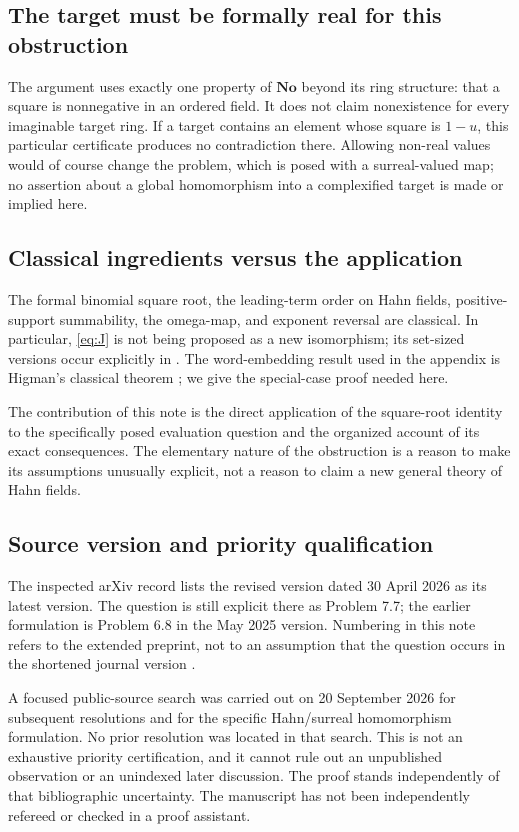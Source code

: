 \documentclass[11pt,letterpaper]{article}
\theoremstyle{definition}
\theoremstyle{remark}
\newcommand{\No}{\mathbf{No}}
\begin{document}
\subsection{The target must be formally real for this obstruction}
The argument uses exactly one property of $\No$ beyond its ring structure:
that a square is nonnegative in an ordered field. It does not claim
nonexistence for every imaginable target ring. If a target contains an element
whose square is $1-u$, this particular certificate produces no contradiction
there. Allowing non-real values would of course change the problem, which is
posed with a surreal-valued map; no assertion about a global homomorphism into
a complexified target is made or implied here.

\subsection{Classical ingredients versus the application}
The formal binomial square root, the leading-term order on Hahn fields,
positive-support summability, the omega-map, and exponent reversal are
classical. In particular, \eqref{eq:J} is not being proposed as a new
isomorphism; its set-sized versions occur explicitly in
\citet[p.~176]{DriesEhrlich2001}. The word-embedding result used in the appendix
is Higman's classical theorem \citep{Higman1952}; we give the special-case proof
needed here.

The contribution of this note is the direct application of the square-root
identity to the specifically posed evaluation question and the organized
account of its exact consequences. The elementary nature of the obstruction
is a reason to make its assumptions unusually explicit, not a reason to
claim a new general theory of Hahn fields.

\subsection{Source version and priority qualification}
The inspected arXiv record lists the revised version dated 30 April 2026 as
its latest version. The question is still explicit there as Problem 7.7;
the earlier formulation is Problem 6.8 in the May 2025 version. Numbering in
this note refers to the extended preprint, not to an assumption that the
question occurs in the shortened journal version \citep{Lipparini2026}.

A focused public-source search was carried out on 20 September 2026 for
subsequent resolutions and for the specific Hahn/surreal homomorphism
formulation. No prior resolution was located in that search. This is not an
exhaustive priority certification, and it cannot rule out an unpublished
observation or an unindexed later discussion. The proof stands independently
of that bibliographic uncertainty. The manuscript has not been independently
refereed or checked in a proof assistant.
\end{document}
